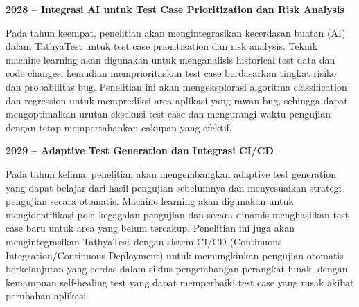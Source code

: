 \textbf{2028 -- Integrasi AI untuk Test Case Prioritization dan Risk Analysis}

Pada tahun keempat, penelitian akan mengintegrasikan kecerdasan buatan (AI) dalam TathyaTest untuk test case prioritization dan risk analysis. Teknik machine learning akan digunakan untuk menganalisis historical test data dan code changes, kemudian memprioritaskan test case berdasarkan tingkat risiko dan probabilitas bug. Penelitian ini akan mengeksplorasi algoritma classification dan regression untuk memprediksi area aplikasi yang rawan bug, sehingga dapat mengoptimalkan urutan eksekusi test case dan mengurangi waktu pengujian dengan tetap mempertahankan cakupan yang efektif.

\textbf{2029 -- Adaptive Test Generation dan Integrasi CI/CD}

Pada tahun kelima, penelitian akan mengembangkan adaptive test generation yang dapat belajar dari hasil pengujian sebelumnya dan menyesuaikan strategi pengujian secara otomatis. Machine learning akan digunakan untuk mengidentifikasi pola kegagalan pengujian dan secara dinamis menghasilkan test case baru untuk area yang belum tercakup. Penelitian ini juga akan mengintegrasikan TathyaTest dengan sistem CI/CD (Continuous Integration/Continuous Deployment) untuk memungkinkan pengujian otomatis berkelanjutan yang cerdas dalam siklus pengembangan perangkat lunak, dengan kemampuan self-healing test yang dapat memperbaiki test case yang rusak akibat perubahan aplikasi.

